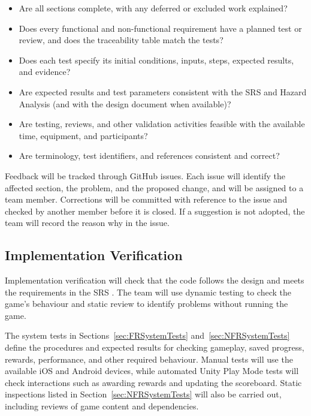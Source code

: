\documentclass[10pt,titlepage]{article}
\begin{document}
\begin{itemize}[label={$\square$}, leftmargin=*, itemsep=0.35em]
    \item Are all sections complete, with any deferred or
    excluded work explained?

    \item Does every functional and non-functional requirement have a planned
    test or review, and does the traceability table match the tests?

    \item Does each test specify its initial conditions, inputs, steps, expected results, and evidence?

    \item Are expected results and test parameters consistent with the SRS
    and Hazard Analysis (and with the design document when available)?

    \item Are testing, reviews, and other validation activities feasible with the available time, equipment, and participants?

    \item Are terminology, test identifiers, and references consistent and
    correct?
\end{itemize}

Feedback will be tracked through GitHub issues. Each issue will identify the affected section, the problem,
and the proposed change, and will be assigned to a team member. Corrections
will be committed with reference to the issue and checked by another member
before it is closed. If a suggestion is not adopted, the team will record the
reason why in the issue.

\subsection{Implementation Verification}\label{sec:ImplementationVerification}

Implementation verification will check that the code follows the design and
meets the requirements in the SRS \cite{SRS}. The team will use dynamic testing
to check the game's behaviour and static review to identify problems without
running the game.

The system tests in Sections~\ref{sec:FRSystemTests}
and~\ref{sec:NFRSystemTests} define the procedures and expected results for
checking gameplay, saved progress, rewards, performance, and other required
behaviour. Manual tests will use the available iOS and Android devices, while
automated Unity Play Mode tests will check interactions such as awarding
rewards and updating the scoreboard. Static inspections listed in
Section~\ref{sec:NFRSystemTests} will also be carried out, including reviews
of game content and dependencies.
\end{document}
